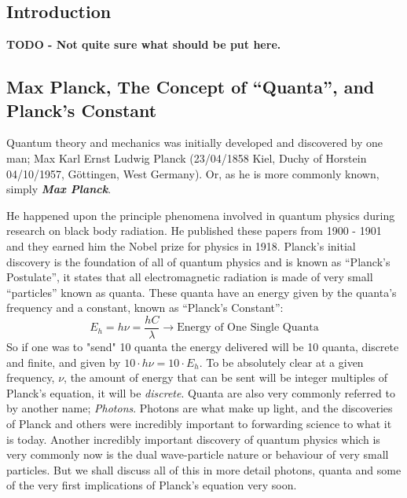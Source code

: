 \documentclass[colorlinks,11pt,a4paper,normalphoto,withhyper,ragged2e]{altareport}
\begin{document}
	\subsection{Introduction}
		\vspace{15mm}
		\textbf{\color{accent} TODO - Not quite sure what should be put here.}


	\subsection{Max Planck, The Concept of ``Quanta'', and Planck’s Constant}
	Quantum theory and mechanics was initially developed and discovered by one man; Max Karl Ernst Ludwig Planck (23/04/1858 Kiel, Duchy of Horstein ~ 04/10/1957, Göttingen, West Germany). Or, as he is more commonly known, simply \textbf{\textit{Max Planck}}. \linebreak
	
	He happened upon the principle phenomena involved in quantum physics during research on black body radiation. He published these papers from 1900 - 1901 and they earned him the Nobel prize for physics in 1918. \linebreak
	Planck's initial discovery is the foundation of all of quantum physics and is known as ``Planck's Postulate'', it states that all electromagnetic radiation is made of very small ``particles'' known as quanta. These quanta have an energy given by the quanta's frequency and a constant, known as ``Planck's Constant'': \linebreak
	\begin{equation}
		E_h = \Planckconst \nu = \frac{\Planckconst C}{\lambda} \rightarrow \text{Energy of One Single Quanta}
	\end{equation} \linebreak
	So if one was to "send" 10 quanta the energy delivered will be 10 quanta, discrete and finite, and given by $10 \cdot \Planckconst\nu = 10\cdot E_h$. To be absolutely clear at a given frequency, $\nu$, the amount of energy that can be sent will be integer multiples of Planck's equation, it will be \textit{discrete}. \linebreak
	Quanta are also very commonly referred to by another name; \textit{Photons}. Photons are what make up light, and the discoveries of Planck and others were incredibly important to forwarding science to what it is today. Another incredibly important discovery of quantum physics which is very commonly now is the dual wave-particle nature or behaviour of very small particles. But we shall discuss all of this in more detail photons, quanta and some of the very first implications of Planck's equation very soon. \linebreak
	
\end{document}
